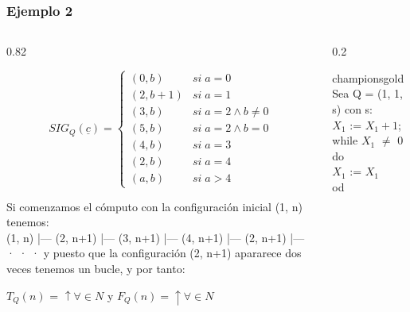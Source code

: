 \documentclass[xcolor=table]{beamer}
\begin{document}
\begin{frame}[fragile]\frametitle{Ejemplo 2} \scriptsize  

\begin{columns}

    \begin{column}{0.82\textwidth}
       
         \scriptsize\begin{equation*} SIG_Q(\underline{c}) = 
        \begin{cases} 
                (0,b)    & si\; a =0  \\
                (2,b+1)  & si\; a =1  \\
                (3,b)    & si\; a = 2 \wedge b\neq 0  \\
                (5,b)    & si\; a = 2 \wedge b = 0 \\
                (4,b)    & si\; a = 3 \\
                (2,b)   & si\; a = 4 \\
                (a,b)    & si\; a > 4 
        \end{cases} \end{equation*}   

        Si comenzamos el cómputo con la configuración inicial (1, n) tenemos:\\
        \vspace{0.2cm}
(1, n) |— (2, n+1) |— (3, n+1) |— (4, n+1) |— (2, n+1) |— · · · y puesto que la configuración (2, n+1) apararece dos veces tenemos un bucle, y por tanto:
\vspace{0.2cm}

$T_Q(n)$ = $\uparrow \forall \in N$ y $F_Q(n) = \uparrow \forall \in N$

    \end{column}


    \begin{column}{0.2\textwidth}
        \begin{colorblock}[black]{championsgold}{}\scriptsize
        Sea Q = (1, 1, s) con s: \\
        \hspace{0.5cm}   $X_1$ := $X_1 + 1$;\\
        \hspace{0.5cm}   while $X_1$ $\neq$ 0 do \\
        \hspace{0.75cm}    $X_1$ := $X_1$\\
        \hspace{0.5cm}  od
        \end{colorblock}
    \end{column}
    
\end{columns}
        
\end{frame}
\end{document}
